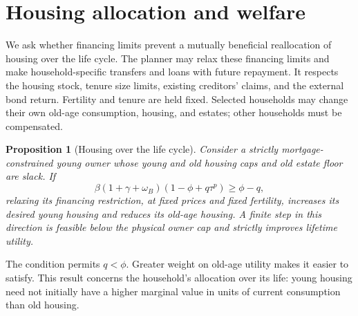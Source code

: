 \documentclass[11pt]{article}
\newtheorem{proposition}{Proposition}
\begin{document}
\section{Housing allocation and welfare}

We ask whether financing limits prevent a mutually beneficial reallocation
of housing over the life cycle. The planner may relax these financing limits
and make household-specific transfers and loans with future repayment.
It respects the housing stock, tenure size limits,
existing creditors' claims, and the external bond return. Fertility and tenure
are held fixed. Selected households may change their own old-age consumption,
housing, and estates; other households must be compensated.

\begin{proposition}[Housing over the life cycle]
Consider a strictly mortgage-constrained young owner whose young and old
housing caps and old estate floor are slack. If
\begin{equation}
\boxed{\quad
\beta(1+\gamma+\omega_B)(1-\phi+q\tau^p)\ge\phi-q,
\quad}
\label{eq:new_housing_condition}
\end{equation}
relaxing its financing restriction, at fixed prices and fixed fertility,
increases its desired young housing and reduces its old-age housing. A finite
step in this direction is feasible below the physical owner cap and strictly
improves lifetime utility.
\label{prop:new_lifetime}
\end{proposition}

The condition permits $q<\phi$. Greater weight on old-age utility makes it
easier to satisfy. This result concerns the household's allocation over its
life: young housing need not initially have a higher marginal value in units
of current consumption than old housing.
\end{document}
